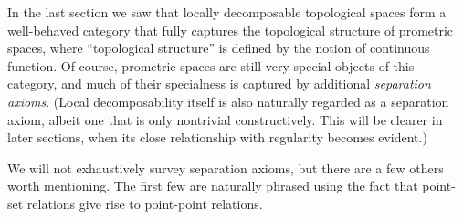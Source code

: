 \documentclass{article}
\begin{document}
In the last section we saw that locally decomposable topological spaces form a well-behaved category that fully captures the topological structure of prometric spaces, where ``topological structure'' is defined by the notion of continuous function.
Of course, prometric spaces are still very special objects of this category, and much of their specialness is captured by additional \emph{separation axioms}.
(Local decomposability itself is also naturally regarded as a separation axiom, albeit one that is only nontrivial constructively.
This will be clearer in later sections, when its close relationship with regularity becomes evident.)

We will not exhaustively survey separation axioms, but there are a few others worth mentioning.
The first few are naturally phrased using the fact that point-set relations give rise to point-point relations.
\end{document}
